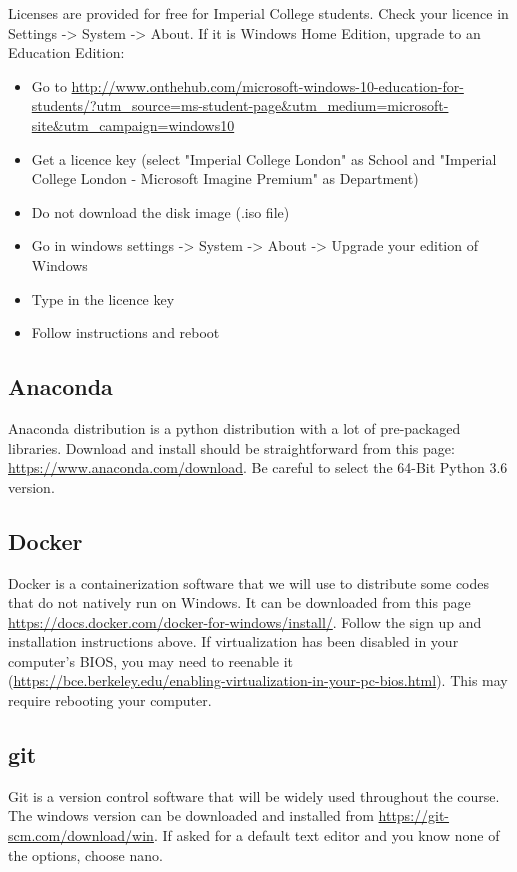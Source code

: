 \documentclass[11pt]{article}
\begin{document}
Licenses are provided for free for Imperial College students. Check your licence in Settings -> System -> About. If it is Windows Home Edition, upgrade to an Education Edition:
\begin{itemize}
  \item Go to \url{http://www.onthehub.com/microsoft-windows-10-education-for-students/?utm_source=ms-student-page&utm_medium=microsoft-site&utm_campaign=windows10}
  \item Get a licence key (select 
 "Imperial College London" as School and "Imperial College London - Microsoft Imagine Premium" as Department)
  \item Do not download the disk image (.iso file)
  \item Go in windows settings -> System -> About -> Upgrade your edition of Windows
  \item Type in the licence key
  \item Follow instructions and reboot
\end{itemize}

\subsection{Anaconda}

Anaconda distribution is a python distribution with a lot of pre-packaged libraries. 
Download and install should be straightforward from this page: \url{https://www.anaconda.com/download}. 
Be careful to select the 64-Bit Python 3.6 version.

\subsection{Docker}

Docker is a containerization software that we will use to distribute some codes that do not natively run on Windows. 
It can be downloaded from this page \url{https://docs.docker.com/docker-for-windows/install/}. 
Follow the sign up and installation instructions above. If virtualization has been disabled in your computer's BIOS, you may need to reenable it (\url{https://bce.berkeley.edu/enabling-virtualization-in-your-pc-bios.html}). This may require rebooting your computer.

\subsection{git}

Git is a version control software that will be widely used throughout the course. 
The windows version can be downloaded and installed from \url{https://git-scm.com/download/win}. 
If asked for a default text editor and you know none of the options, choose nano.
\end{document}
